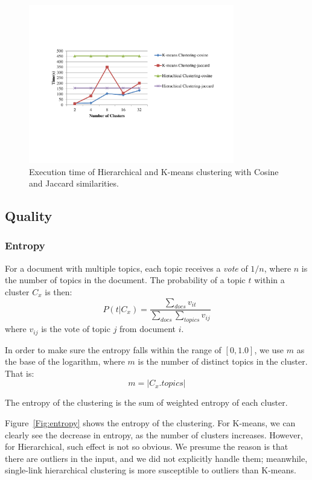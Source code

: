 \documentclass{article}
\begin{document}
\begin{figure}
\centering
\includegraphics[width=0.8\textwidth]{Scalability}
\caption{\footnotesize Execution time of Hierarchical and K-means clustering
with Cosine and Jaccard similarities.}
\label{Fig:scalability}
\end{figure}
\subsection{Quality}
\subsubsection{Entropy}
For a document with multiple topics, each topic receives a \emph{vote} of
$1/n$, where $n$ is the number of topics in the document. The probability of a
topic $t$ within a cluster $C_x$ is then:
\begin{equation}
P(t|C_x)=\frac{\sum_{docs}v_{it}}{\sum_{docs}\sum_{topics}v_{ij}}
\end{equation}
where $v_{ij}$ is the vote of topic $j$ from document $i$.

In order to make sure the entropy falls within the range of $[0, 1.0]$, we use
$m$ as the base of the logarithm, where $m$ is the number of distinct topics in
the cluster. That is:
\begin{equation}
m = |C_x.topics|
\end{equation}

The entropy of the clustering is the sum of weighted entropy of each cluster. 

Figure~\ref{Fig:entropy} shows the entropy of the clustering. For
K-means, we can clearly see the decrease in entropy, as the number of clusters
increases. However, for Hierarchical, such effect is not so obvious. We presume
the reason is that there are outliers in the input, and we did not
explicitly handle them; meanwhile, single-link hierarchical clustering is more
susceptible to outliers than K-means.
\end{document}
